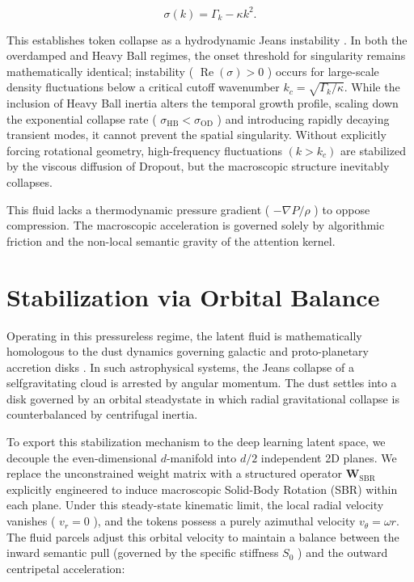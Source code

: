 \documentclass[10pt]{article}
\begin{document}
\begin{equation}
\sigma(k)=\Gamma_{k}-\kappa k^{2} .
\end{equation}


This establishes token collapse as a hydrodynamic Jeans instability \cite{ref14}. In both the overdamped and Heavy Ball regimes, the onset threshold for singularity remains mathematically identical; instability ( $\operatorname{Re}(\sigma)>0$ ) occurs for large-scale density fluctuations below a critical cutoff wavenumber $k_{c}=\sqrt{\Gamma_{k} / \kappa}$. While the inclusion of Heavy Ball inertia alters the temporal growth profile, scaling down the exponential collapse rate ( $\sigma_{\mathrm{HB}}<\sigma_{\mathrm{OD}}$ ) and introducing rapidly decaying transient modes, it cannot prevent the spatial singularity. Without explicitly forcing rotational geometry, high-frequency fluctuations $\left(k>k_{c}\right)$ are stabilized by the viscous diffusion of Dropout, but the macroscopic structure inevitably collapses.

This fluid lacks a thermodynamic pressure gradient ( $-\nabla P / \rho$ ) to oppose compression. The macroscopic acceleration is governed solely by algorithmic friction and the non-local semantic gravity of the attention kernel.

\section{Stabilization via Orbital Balance}

Operating in this pressureless regime, the latent fluid is mathematically homologous to the dust dynamics governing galactic and proto-planetary accretion disks \cite{ref15,ref16}. In such astrophysical systems, the Jeans collapse \cite{ref14} of a selfgravitating cloud is arrested by angular momentum. The dust settles into a disk governed by an orbital steadystate in which radial gravitational collapse is counterbalanced by centrifugal inertia.

To export this stabilization mechanism to the deep learning latent space, we decouple the even-dimensional $d$-manifold into $d / 2$ independent 2D planes. We replace the unconstrained weight matrix with a structured operator $\mathbf{W}_{\mathrm{SBR}}$ explicitly engineered to induce macroscopic Solid-Body Rotation (SBR) within each plane. Under this steady-state kinematic limit, the local radial velocity vanishes ( $v_{r}=0$ ), and the tokens possess a purely azimuthal velocity $v_{\theta}=\omega r$. The fluid parcels adjust this orbital velocity to maintain a balance between the inward semantic pull (governed by the specific stiffness $S_{0}$ ) and the outward centripetal acceleration:
\end{document}
